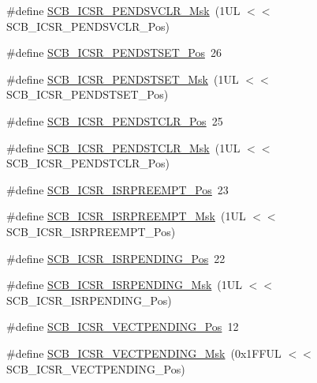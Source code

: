 \begin{DoxyCompactItemize}
\item 
\#define \hyperlink{group___c_m_s_i_s___s_c_b_ga4a901ace381d3c1c74ac82b22fae2e1e}{S\-C\-B\-\_\-\-I\-C\-S\-R\-\_\-\-P\-E\-N\-D\-S\-V\-C\-L\-R\-\_\-\-Msk}~(1\-U\-L $<$$<$ S\-C\-B\-\_\-\-I\-C\-S\-R\-\_\-\-P\-E\-N\-D\-S\-V\-C\-L\-R\-\_\-\-Pos)
\item 
\#define \hyperlink{group___c_m_s_i_s___s_c_b_ga9dbb3358c6167c9c3f85661b90fb2794}{S\-C\-B\-\_\-\-I\-C\-S\-R\-\_\-\-P\-E\-N\-D\-S\-T\-S\-E\-T\-\_\-\-Pos}~26
\item 
\#define \hyperlink{group___c_m_s_i_s___s_c_b_ga7325b61ea0ec323ef2d5c893b112e546}{S\-C\-B\-\_\-\-I\-C\-S\-R\-\_\-\-P\-E\-N\-D\-S\-T\-S\-E\-T\-\_\-\-Msk}~(1\-U\-L $<$$<$ S\-C\-B\-\_\-\-I\-C\-S\-R\-\_\-\-P\-E\-N\-D\-S\-T\-S\-E\-T\-\_\-\-Pos)
\item 
\#define \hyperlink{group___c_m_s_i_s___s_c_b_gadbe25e4b333ece1341beb1a740168fdc}{S\-C\-B\-\_\-\-I\-C\-S\-R\-\_\-\-P\-E\-N\-D\-S\-T\-C\-L\-R\-\_\-\-Pos}~25
\item 
\#define \hyperlink{group___c_m_s_i_s___s_c_b_gab241827d2a793269d8cd99b9b28c2157}{S\-C\-B\-\_\-\-I\-C\-S\-R\-\_\-\-P\-E\-N\-D\-S\-T\-C\-L\-R\-\_\-\-Msk}~(1\-U\-L $<$$<$ S\-C\-B\-\_\-\-I\-C\-S\-R\-\_\-\-P\-E\-N\-D\-S\-T\-C\-L\-R\-\_\-\-Pos)
\item 
\#define \hyperlink{group___c_m_s_i_s___s_c_b_ga11cb5b1f9ce167b81f31787a77e575df}{S\-C\-B\-\_\-\-I\-C\-S\-R\-\_\-\-I\-S\-R\-P\-R\-E\-E\-M\-P\-T\-\_\-\-Pos}~23
\item 
\#define \hyperlink{group___c_m_s_i_s___s_c_b_gaa966600396290808d596fe96e92ca2b5}{S\-C\-B\-\_\-\-I\-C\-S\-R\-\_\-\-I\-S\-R\-P\-R\-E\-E\-M\-P\-T\-\_\-\-Msk}~(1\-U\-L $<$$<$ S\-C\-B\-\_\-\-I\-C\-S\-R\-\_\-\-I\-S\-R\-P\-R\-E\-E\-M\-P\-T\-\_\-\-Pos)
\item 
\#define \hyperlink{group___c_m_s_i_s___s_c_b_ga10749d92b9b744094b845c2eb46d4319}{S\-C\-B\-\_\-\-I\-C\-S\-R\-\_\-\-I\-S\-R\-P\-E\-N\-D\-I\-N\-G\-\_\-\-Pos}~22
\item 
\#define \hyperlink{group___c_m_s_i_s___s_c_b_ga056d74fd538e5d36d3be1f28d399c877}{S\-C\-B\-\_\-\-I\-C\-S\-R\-\_\-\-I\-S\-R\-P\-E\-N\-D\-I\-N\-G\-\_\-\-Msk}~(1\-U\-L $<$$<$ S\-C\-B\-\_\-\-I\-C\-S\-R\-\_\-\-I\-S\-R\-P\-E\-N\-D\-I\-N\-G\-\_\-\-Pos)
\item 
\#define \hyperlink{group___c_m_s_i_s___s_c_b_gada60c92bf88d6fd21a8f49efa4a127b8}{S\-C\-B\-\_\-\-I\-C\-S\-R\-\_\-\-V\-E\-C\-T\-P\-E\-N\-D\-I\-N\-G\-\_\-\-Pos}~12
\item 
\#define \hyperlink{group___c_m_s_i_s___s_c_b_gacb6992e7c7ddc27a370f62878a21ef72}{S\-C\-B\-\_\-\-I\-C\-S\-R\-\_\-\-V\-E\-C\-T\-P\-E\-N\-D\-I\-N\-G\-\_\-\-Msk}~(0x1\-F\-F\-U\-L $<$$<$ S\-C\-B\-\_\-\-I\-C\-S\-R\-\_\-\-V\-E\-C\-T\-P\-E\-N\-D\-I\-N\-G\-\_\-\-Pos)

\end{DoxyCompactItemize}
